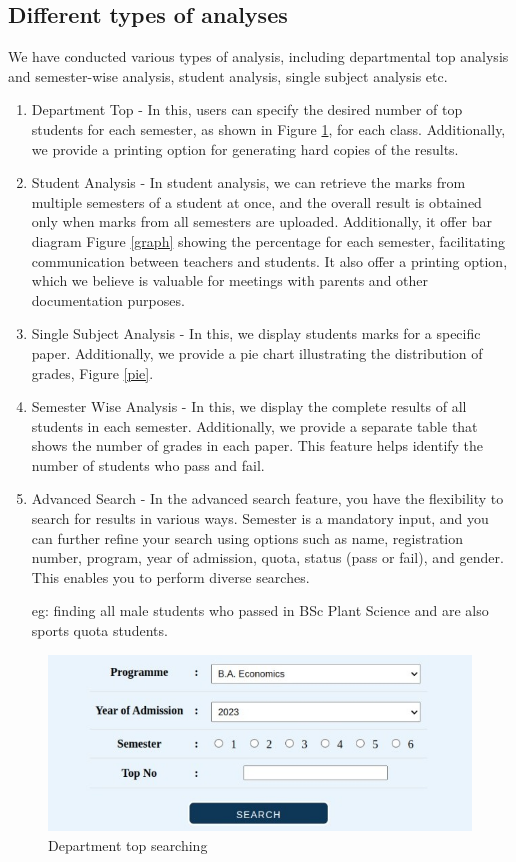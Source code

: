 \documentclass{nascproject}
\begin{document}
\subsection{Different types of analyses}
We have conducted various types of analysis, including departmental top analysis and semester-wise analysis, student analysis, single subject analysis etc.
\begin{enumerate}
	\item Department Top - In this, users can specify the desired number of top students for each semester, as shown in Figure \ref{dept_top}, for each class. Additionally, we provide a printing option for generating hard copies of the results.
	\item Student Analysis - In student analysis, we can retrieve the marks from multiple semesters of a student at once, and the overall result is obtained only when marks from all semesters are uploaded. Additionally, it offer bar diagram Figure \ref{graph} showing the percentage for each semester, facilitating communication between teachers and students. It also offer a printing option, which we believe is valuable for meetings with parents and other documentation purposes.
	\item Single Subject Analysis - In this, we display students marks for a specific paper. Additionally, we provide a pie chart illustrating the distribution of grades, Figure \ref{pie}.
	\item Semester Wise Analysis - In this, we display the complete results of all students in each semester. Additionally, we provide a separate table that shows the number of grades in each paper. This feature helps identify the number of students who pass and fail.
	\item Advanced Search - In the advanced search feature, you have the flexibility to search for results in various ways. Semester is a mandatory input, and you can further refine your search using options such as name, registration number, program, year of admission, quota, status (pass or fail), and gender. This enables you to perform diverse searches.
	
	eg: finding all male students who passed in BSc Plant Science and are also sports quota students.
	
\end{enumerate}
\begin{figure}
	\centering
	\includegraphics[width=1\linewidth]{top.jpeg}
	\caption{Department top searching}
	\label{dept_top}
\end{figure}
\end{document}
